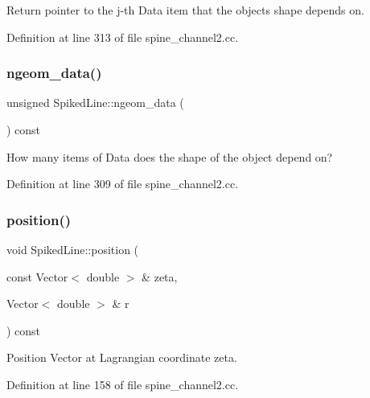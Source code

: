 Return pointer to the j-\/th Data item that the object\textquotesingle{}s shape depends on. 



Definition at line 313 of file spine\+\_\+channel2.\+cc.

\mbox{\label{classSpikedLine_a13ef991b5c044d5f6ce154122c10aeca}} 
\subsubsection{\texorpdfstring{ngeom\+\_\+data()}{ngeom\_data()}}
{\footnotesize\ttfamily unsigned Spiked\+Line\+::ngeom\+\_\+data (\begin{DoxyParamCaption}{ }\end{DoxyParamCaption}) const\hspace{0.3cm}{\ttfamily [inline]}}



How many items of Data does the shape of the object depend on? 



Definition at line 309 of file spine\+\_\+channel2.\+cc.

\mbox{\label{classSpikedLine_a11a6078a409096caaf21dd56b97e1528}} 
\subsubsection{\texorpdfstring{position()}{position()}\hspace{0.1cm}{\footnotesize\ttfamily [1/2]}}
{\footnotesize\ttfamily void Spiked\+Line\+::position (\begin{DoxyParamCaption}\item[{const Vector$<$ double $>$ \&}]{zeta,  }\item[{Vector$<$ double $>$ \&}]{r }\end{DoxyParamCaption}) const\hspace{0.3cm}{\ttfamily [inline]}}



Position Vector at Lagrangian coordinate zeta. 



Definition at line 158 of file spine\+\_\+channel2.\+cc.



